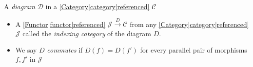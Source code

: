 
A \emph{diagram} $\mathcal{D}$ in a \ref{Category|category|referenced} $\mathcal{C}$

\begin{itemize}
    \item  A \ref{Functor|functor|referenced} $\mathcal{J}\xrightarrow{D}\mathcal{C}$ from any \ref{Category|category|referenced} $\mathcal{J}$ called the \emph{indexing category} of the diagram $D$.
    \item We say $D$ \emph{commutes} if $D(f)=D(f')$ for every parallel pair of morphisms $f,f'$ in $\mathcal{J}$

  \end{itemize}
